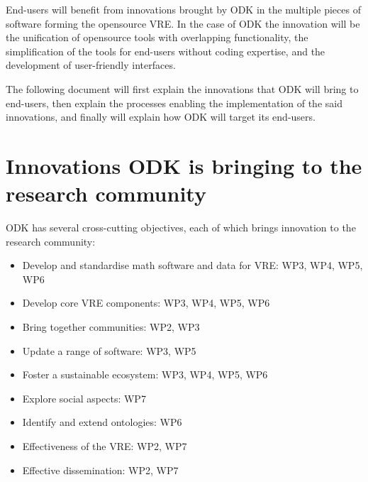 \documentclass{deliverablereport}
\begin{document}
End-users will benefit from innovations brought by ODK in the
multiple pieces of software forming the opensource VRE. In the case of
ODK the innovation will be the unification of opensource
tools with overlapping functionality, the simplification of the tools
for end-users without coding expertise, and the development of
user-friendly interfaces.

The following document will first explain the innovations that
ODK will bring to end-users, then explain the processes
enabling the implementation of the said innovations, and finally will
explain how ODK will target its end-users.


\section{Innovations ODK is bringing to the research community}

ODK has several cross-cutting objectives, each of which
brings innovation to the research community:
\begin{itemize}
\item{Develop and standardise math software and data for VRE: WP3, WP4, WP5, WP6}
\item{Develop core VRE components: WP3, WP4, WP5, WP6}
\item{Bring together communities: WP2, WP3}
\item{Update a range of software: WP3, WP5}
\item{Foster a sustainable ecosystem: WP3, WP4, WP5, WP6}
\item{Explore social aspects: WP7}
\item{Identify and extend ontologies: WP6}
\item{Effectiveness of the VRE: WP2, WP7}
\item{Effective dissemination: WP2, WP7}
\end{itemize}
\end{document}
